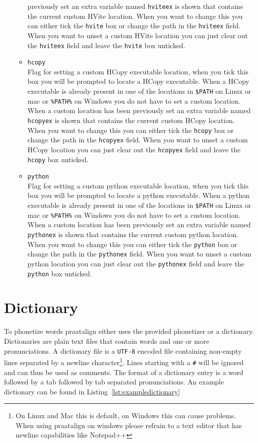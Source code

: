 \begin{itemize}
\begin{itemize}
				previously set an extra variable named \texttt{hviteex} is shown that
				contains the current custom HVite location. When you want to change
				this you can either tick the \texttt{hvite} box or change the path in
				the \texttt{hviteex} field. When you want to unset a custom HVite
				location you can just clear out the \texttt{hviteex} field and leave
				the \texttt{hvite} box unticked.
			\item \texttt{hcopy}\\
				Flag for setting a custom HCopy executable location, when you tick this
				box you will be prompted to locate a HCopy executable. When a HCopy
				executable is already present in one of the locations in
				\texttt{\$PATH} on Linux or mac or \texttt{\%PATH\%} on Windows you do
				not have to set a custom location. When a custom location has been
				previously set an extra variable named \texttt{hcopyex} is shown that
				contains the current custom HCopy location. When you want to change
				this you can either tick the \texttt{hcopy} box or change the path in
				the \texttt{hcopyex} field. When you want to unset a custom HCopy
				location you can just clear out the \texttt{hcopyex} field and leave
				the \texttt{hcopy} box unticked.
			\item \texttt{python}\\
				Flag for setting a custom python executable location, when you tick
				this box you will be prompted to locate a python executable. When a
				python executable is already present in one of the locations in
				\texttt{\$PATH} on Linux or mac or \texttt{\%PATH\%} on Windows you do
				not have to set a custom location. When a custom location has been
				previously set an extra variable named \texttt{pythonex} is shown that
				contains the current custom python location. When you want to change
				this you can either tick the \texttt{python} box or change the path in
				the \texttt{pythonex} field. When you want to unset a custom python
				location you can just clear out the \texttt{pythonex} field and leave
				the \texttt{python} box unticked.
		\end{itemize}
\end{itemize}

\section{Dictionary}
To phonetize words praatalign either uses the provided phonetizer or a
dictionary. Dictionaries are plain text files that contain words and one or
more pronunciations. A dictionary file is a \texttt{UTF-8} encoded file
containing non-empty lines separated by a newline
character\footnote{\label{fn:n1}On Linux and Mac this is default, on Windows
this can cause problems. When using praatalign on windows please refrain to a
text editor that has newline capabilities like Notepad++}. Lines starting with
a \texttt{\#} will be ignored and can thus be used as comments. The format of a
dictionary entry is a word followed by a tab followed by tab separated
pronunciations. An example dictionary can be found in
Listing~\ref{lst:exampledictionary}

